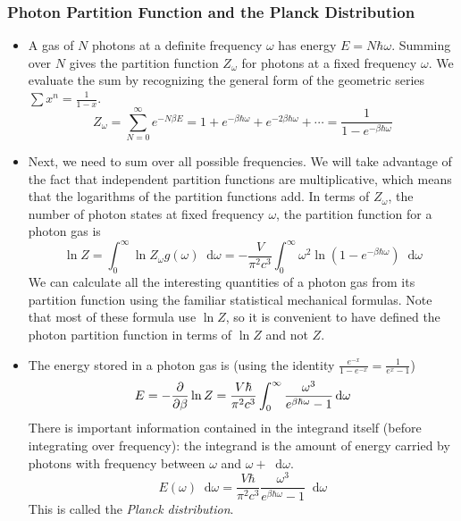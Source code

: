 \documentclass[11pt, a4paper]{article}
\newcommand{\diff}{\mathop{}\!\mathrm{d}} %
\begin{document}
\subsubsection{Photon Partition Function and the Planck Distribution}

\begin{itemize}	
	\item A gas of $ N $ photons at a definite frequency $ \omega $ has energy $ E = N \hbar \omega $. Summing over $ N $ gives the partition function $ Z_{\omega} $ for photons at a fixed frequency $ \omega $. We evaluate the sum by recognizing the general form of the geometric series $ \sum x^{n} = \frac{1}{1 - x}$.
	\begin{equation*}
		Z_{\omega} = \sum_{N = 0}^{\infty} e^{-N\beta E} = 1 + e^{-\beta \hbar \omega} + e^{-2 \beta \hbar \omega}  + \cdots = \frac{1}{1 - e^{-\beta \hbar \omega}}
	\end{equation*}
	
	\item Next, we need to sum over all possible frequencies. We will take advantage of the fact that independent partition functions are multiplicative, which means that the logarithms of the partition functions add. In terms of $ Z_{\omega} $, the number of photon states at fixed frequency $ \omega $, the partition function for a photon gas is
	\begin{equation*}
		\ln Z = \int_{0}^{\infty} \ln Z_{\omega} g(\omega) \diff \omega = - \frac{V}{\pi^{2}c^{3}} \int_{0}^{\infty}\omega^{2} \ln (1-e^{-\beta \hbar \omega}) \diff \omega
	\end{equation*}
	We can calculate all the interesting quantities of a photon gas from its partition function using the familiar statistical mechanical formulas. Note that most of these formula use $ \ln Z $, so it is convenient to have defined the photon partition function in terms of $ \ln Z $ and not $ Z $.
	
	\item The energy stored in a photon gas is (using the identity $\frac{e^{-x}}{1-e^{-x}} = \frac{1}{e^{x} -1}$)
	\begin{equation*}
		E = - \pdv{}{\beta} \ln Z = \frac{V\hbar}{\pi^{2}c^{3}} \int_{0}^{\infty} \frac{\omega^{3}}{e^{\beta \hbar \omega} - 1}\diff \omega
	\end{equation*}
	There is important information contained in the integrand itself (before integrating over frequency): the integrand is the amount of energy carried by photons with frequency between $ \omega $ and $ \omega + \diff \omega$. 
	\begin{equation*}
		E(\omega) \diff \omega = \frac{V\hbar}{\pi^{2}c^{3}}\frac{\omega^{3}}{e^{\beta \hbar \omega} - 1}\diff \omega
	\end{equation*}
	This is called the \textit{Planck distribution}. 
	

\end{itemize}
\end{document}
